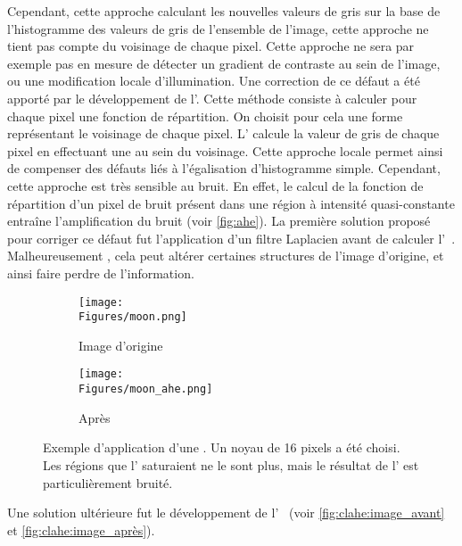 \documentclass[\main/main.tex]{subfiles}
\begin{document}
%
Cependant, cette approche calculant les nouvelles valeurs de gris sur la base de l'histogramme des valeurs de gris de l'ensemble de l'image, cette approche ne tient pas compte du voisinage de chaque pixel. Cette approche ne sera par exemple pas en mesure de détecter un gradient de contraste au sein de l'image, ou une modification locale d'illumination.
%
Une correction de ce défaut a été apporté par le développement de l'\ahe{}\cite{hummel_1977}. Cette méthode consiste à calculer pour chaque pixel une fonction de répartition.
%
On choisit pour cela une forme représentant le voisinage de chaque pixel. L'\ahe{} calcule  la valeur de gris de chaque pixel en effectuant une \he{} au sein du voisinage. Cette approche locale permet ainsi de compenser des défauts liés à l'égalisation d'histogramme simple.
Cependant, cette approche est très sensible au bruit. En effet, le calcul de la fonction de répartition d'un pixel de bruit présent dans une région à intensité quasi-constante entraîne l'amplification du bruit (voir \autoref{fig:ahe}).
%
La première solution proposé pour corriger ce défaut fut l'application d'un filtre Laplacien avant de calculer l'\ahe{}~\cite{hummel_1977}. Malheureusement , cela peut altérer certaines structures de l'image d'origine, et ainsi faire perdre de l'information.

\begin{figure}[h!]
    \centering
    \begin{subfigure}[b]{0.45\textwidth}
       \caption{
       Image d'origine
            }
       \centering \texttt{[image: \\Figures/moon.png]}
    \end{subfigure}
    \begin{subfigure}[b]{0.45\textwidth}
       \caption{
       Après \ahe{}
            }
       \centering \texttt{[image: \\Figures/moon\_ahe.png]}
    \end{subfigure}
    \caption{
        \label{fig:ahe}
        Exemple d'application d'une \ahe{}.\newline
        Un noyau de 16 pixels a été choisi. Les régions que l'\he{} saturaient ne le sont plus, mais le résultat de l'\ahe{} est particulièrement bruité.
    }
\end{figure}
%
Une solution ultérieure fut le développement de l'\clahe{}~\cite{pizer_1987} (voir \autoref{fig:clahe:image_avant} et \autoref{fig:clahe:image_après}).
\end{document}
